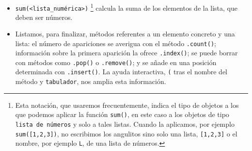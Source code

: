 \begin{enumerate}
\begin{itemize}
\item \lstinline|sum|{\tt(<lista\_numérica>)} \footnote{Esta notación, que
usaremos
frecuentemente, indica el tipo de objetos a los que podemos aplicar la función
\lstinline|sum()|, en este caso  a los objetos de tipo {\tt lista de números} y
solo
a tales listas. Cuando la aplicamos, por ejemplo \lstinline|sum([1,2,3])|, no
escribimos los angulitos sino solo una lista, \lstinline|[1,2,3]| o el nombre,
por
ejemplo \lstinline|L|, de una lista de números.} calcula la suma de los
elementos de
la lista, que deben ser números. 


\item Listamos, para finalizar, métodos referentes a un elemento concreto y una
lista: el número de apariciones se averigua con el método \lstinline|.count()|;
información sobre la primera aparición la ofrece \lstinline|.index()|; 
se puede borrar con métodos como \lstinline|.pop()| o \lstinline|.remove()|; 
y se añade en una posición determinada con \lstinline|.insert()|. La ayuda
interactiva, 
\lstinline|(| tras el nombre del método y \texttt{tabulador}, nos amplia esta
información.

\end{itemize}
\end{enumerate}

